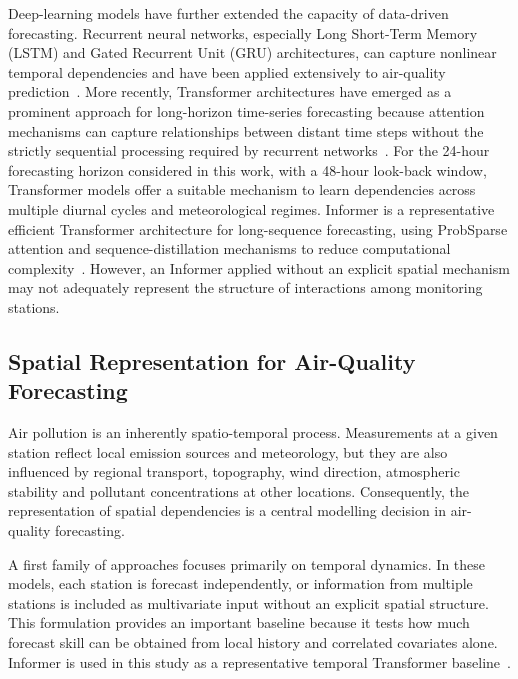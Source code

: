 \documentclass[11pt]{article}
\newenvironment{revnewblock}{%
  \begingroup\color{orange!75!black}%
}{%
  \endgroup%
}
\begin{document}
\begin{revnewblock}
Deep-learning models have further extended the capacity of data-driven forecasting. Recurrent neural networks, especially Long Short-Term Memory (LSTM) and Gated Recurrent Unit (GRU) architectures, can capture nonlinear temporal dependencies and have been applied extensively to air-quality prediction~\cite{Hochreiter1997,Zhao2023,Qin2019}. More recently, Transformer architectures have emerged as a prominent approach for long-horizon time-series forecasting because attention mechanisms can capture relationships between distant time steps without the strictly sequential processing required by recurrent networks~\cite{Vaswani2017,wen2023transformerstimeseriessurvey}. For the 24-hour forecasting horizon considered in this work, with a 48-hour look-back window, Transformer models offer a suitable mechanism to learn dependencies across multiple diurnal cycles and meteorological regimes. Informer is a representative efficient Transformer architecture for long-sequence forecasting, using ProbSparse attention and sequence-distillation mechanisms to reduce computational complexity~\cite{Zhou2021Informer}. However, an Informer applied without an explicit spatial mechanism may not adequately represent the structure of interactions among monitoring stations.

\subsection{Spatial Representation for Air-Quality Forecasting}

Air pollution is an inherently spatio-temporal process. Measurements at a given station reflect local emission sources and meteorology, but they are also influenced by regional transport, topography, wind direction, atmospheric stability and pollutant concentrations at other locations. Consequently, the representation of spatial dependencies is a central modelling decision in air-quality forecasting.

A first family of approaches focuses primarily on temporal dynamics. In these models, each station is forecast independently, or information from multiple stations is included as multivariate input without an explicit spatial structure. This formulation provides an important baseline because it tests how much forecast skill can be obtained from local history and correlated covariates alone. Informer is used in this study as a representative temporal Transformer baseline~\cite{Zhou2021Informer,Zhou2023InformerEx}.


\end{revnewblock}
\end{document}
